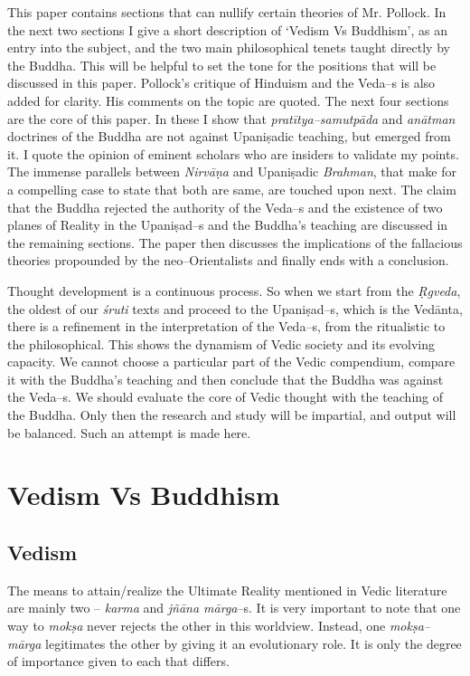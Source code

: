 This paper contains sections that can nullify certain theories of Mr. Pollock. In the next two sections I give a short description of ‘Vedism Vs Buddhism’, as an entry into the subject, and the two main philosophical tenets taught directly by the Buddha. This will be helpful to set the tone for the positions that will be discussed in this paper. Pollock’s critique of Hinduism and the Veda–s is also added for clarity. His comments on the topic are quoted. The next four sections are the core of this paper. In these I show that \textit{pratītya–samutpāda} and \textit{anātman} doctrines of the Buddha are not against Upaniṣadic teaching, but emerged from it. I quote the opinion of eminent scholars who are insiders to validate my points. The immense parallels between \textit{Nirvāṇa} and Upaniṣadic \textit{Brahman}, that make for a compelling case to state that both are same, are touched upon next. The claim that the Buddha rejected the authority of the Veda–s and the existence of two planes of Reality in the Upaniṣad–s and the Buddha’s teaching are discussed in the remaining sections. The paper then discusses the implications of the fallacious theories propounded by the neo–Orientalists and finally ends with a conclusion.

Thought development is a continuous process. So when we start from the \textit{Ṛgveda}, the oldest of our \textit{śruti} texts and proceed to the Upaniṣad–s, which is the Vedānta, there is a refinement in the interpretation of the Veda–s, from the ritualistic to the philosophical. This shows the dynamism of Vedic society and its evolving capacity. We cannot choose a particular part of the Vedic compendium, compare it with the Buddha’s teaching and then conclude that the Buddha was against the Veda–s. We should evaluate the core of Vedic thought with the teaching of the Buddha. Only then the research and study will be impartial, and output will be balanced. Such an attempt is made here.


\section*{Vedism Vs Buddhism}

\subsection*{Vedism}

The means to attain/realize the Ultimate Reality mentioned in Vedic literature are mainly two – \textit{karma} and \textit{jñāna mārga}–s. It is very important to note that one way to \textit{mokṣa} never rejects the other in this worldview. Instead, one \textit{mokṣa–mārga} legitimates the other by giving it an evolutionary role. It is only the degree of importance given to each that differs.

